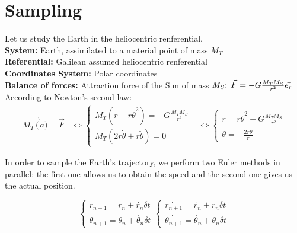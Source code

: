 \section{Sampling}
Let us study the Earth in the heliocentric renferential.\\
\textbf{System:} Earth, assimilated to a material point of mass \(M_{T}\)\\
\textbf{Referential:} Galilean assumed heliocentric renferential\\
\textbf{Coordinates System:} Polar coordinates\\
\textbf{Balance of forces:} Attraction force of the Sun of mass \(M_{S}$: $\vec{F} = -G\frac{M_{T} M_{S}}{r^{2}}\vec{e_{r}}\)\\

According to Newton's second law:
\[
\begin{align*}
M_{T}\vec(a) = \vec{F}
& \iff
\begin{equation}
    \begin{cases}
    M_{T}(\ddot{r}-r\dot{\theta}^{2}) = -G\frac{M_{T} M_{S}}{r^{2}}\\
    M_{T}(2\dot{r}\dot{\theta}+r\ddot{\theta}) = 0
    \end{cases}
\end{equation}
& \iff
\begin{equation}
    \begin{cases}
    \ddot{r} = r\dot{\theta}^{2}-G\frac{M_{T} M_{S}}{r^{2}}\\
    \ddot{\theta} = -\frac{2\dot{r}\dot{\theta}}{r}
    \end{cases}
\end{equation}
\end{align*}
\]

In order to sample the Earth's trajectory, we perform two Euler methods in parallel: the first one allows us to obtain the speed and the second one gives us the actual position.

\[
\begin{equation}
    \begin{cases}
    r_{n+1} = r_{n} + \dot{r_{n}} \delta t\\
    \theta_{n+1} = \theta_{n} + \dot{\theta_{n}} \delta t
\end{cases}
\end{equation}

\begin{equation}
    \begin{cases}
    \dot{r_{n+1}} = \dot{r_{n}} + \ddot{r_{n}} \delta t\\
    \dot{\theta_{n+1}} = \dot{\theta_{n}} + \ddot{\theta_{n}} \delta t
    \end{cases}
\end{equation}
\]


